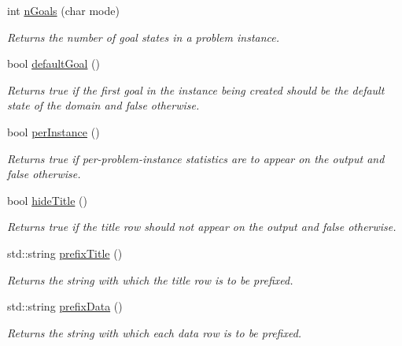 \begin{DoxyCompactItemize}
int \hyperlink{structcommandLine_1_1CommandLine_ae452bbb05339f1107402336c125b6466}{n\+Goals} (char mode)
\begin{DoxyCompactList}\small\item\em Returns the number of goal states in a problem instance. \end{DoxyCompactList}\item 
bool \hyperlink{structcommandLine_1_1CommandLine_a0dd3ba23cf807a1de4d5937fe31e1b93}{default\+Goal} ()
\begin{DoxyCompactList}\small\item\em Returns {\ttfamily true} if the first goal in the instance being created should be the default state of the domain and {\ttfamily false} otherwise. \end{DoxyCompactList}\item 
bool \hyperlink{structcommandLine_1_1CommandLine_a7792c692843bce66ec0a9d0071dbf98c}{per\+Instance} ()
\begin{DoxyCompactList}\small\item\em Returns {\ttfamily true} if per-\/problem-\/instance statistics are to appear on the output and {\ttfamily false} otherwise. \end{DoxyCompactList}\item 
bool \hyperlink{structcommandLine_1_1CommandLine_a59803a6e2fef1286a12d7eb9994c147b}{hide\+Title} ()
\begin{DoxyCompactList}\small\item\em Returns {\ttfamily true} if the title row should not appear on the output and {\ttfamily false} otherwise. \end{DoxyCompactList}\item 
std\+::string \hyperlink{structcommandLine_1_1CommandLine_a4c0c8f4a636bd06d65e2a0d5fe954401}{prefix\+Title} ()
\begin{DoxyCompactList}\small\item\em Returns the string with which the title row is to be prefixed. \end{DoxyCompactList}\item 
std\+::string \hyperlink{structcommandLine_1_1CommandLine_abfe953e36cfa98aa940b51cf345a2de3}{prefix\+Data} ()
\begin{DoxyCompactList}\small\item\em Returns the string with which each data row is to be prefixed. \end{DoxyCompactList}\end{DoxyCompactItemize}

